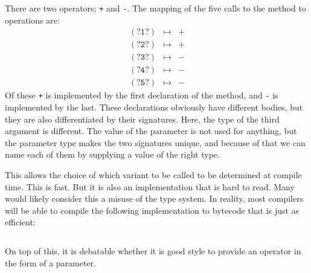 There are two operators; \texttt{+} and \texttt{-}. The mapping of the five calls to the  method to operations are:
\begin{eqnarray*}
    \mathtt{(?1?)} &\mapsto& \mathtt{+} \\
    \mathtt{(?2?)} &\mapsto& \mathtt{+} \\
    \mathtt{(?3?)} &\mapsto& \mathtt{-} \\
    \mathtt{(?4?)} &\mapsto& \mathtt{-} \\
    \mathtt{(?5?)} &\mapsto& \mathtt{-}
\end{eqnarray*}
Of these \texttt{+} is implemented by the first declaration of the  method, and \texttt{-} is implemented by the last. These declarations obviously have different bodies, but they are also differentiated by their signatures. Here, the type of the third argument is different. The value of the parameter is not used for anything, but the parameter type makes the two signatures unique, and because of that we can name each of them by supplying a value of the right type.

This allows the choice of which  variant to be called to be determined at compile time. This is fast. But it is also an implementation that is hard to read. Many would likely consider this a misuse of the type system. In reality, most compilers will be able to compile the following implementation to bytecode that is just as efficient:

\inputminted{csharp}{\context/answer/OperatorTest.cs}

On top of this, it is debatable whether it is good style to provide an operator in the form of a parameter.

